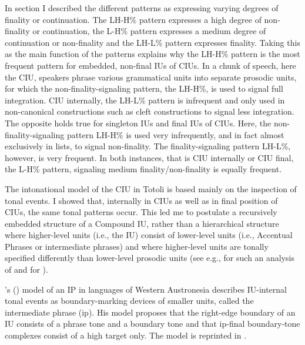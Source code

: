 In section  I described the different patterns as  expressing varying degrees of finality or continuation. The LH-H\% pattern expresses a high degree of non-finality or continuation, the L-H\% pattern expresses a medium degree of continuation or non-finality and the LH-L\% pattern expresses finality. Taking this as the main function of the patterns explains why the LH-H\% pattern is the most frequent pattern for embedded, non-final IUs of CIUs. In a chunk of speech, here the CIU, speakers phrase various grammatical units into separate prosodic units, for which the non-finality-signaling pattern, the LH-H\%, is used to signal full integration. CIU internally, the LH-L\% pattern is infrequent and only used in non-canonical constructions such as cleft constructions to signal less integration. The opposite holds true for singleton IUs and final IUs of CIUs. Here, the non-finality-signaling pattern LH-H\% is used very infrequently, and in fact almost exclusively in lists, to signal non-finality. The finality-signaling pattern LH-L\%, however, is very frequent. In both instances, that is CIU internally or CIU final, the L-H\% pattern, signaling medium finality/non-finality is equally frequent.




The intonational model of the CIU in Totoli is based mainly on the inspection of tonal events. I showed that, internally in CIUs as well as in final position of CIUs, the same tonal patterns occur. This led me to postulate a recursively embedded structure of a Compound IU, rather than a hierarchical structure where higher-level units (i.e., the IU) consist of lower-level units (i.e., Accentual Phrases  or intermediate phrases) and where higher-level units are tonally specified differently than lower-level prosodic units (see e.g., \cite{Jun_2000} for such an analysis of  and \cite{Turkish_Intonation} for ).

 

\citeauthor{Himmelmann_Preliminary_2018}'s (\citeyear{Himmelmann_Preliminary_2018}) model of an IP  in languages of Western Austronesia describes IU-internal tonal events as boundary-marking devices of smaller units, called the intermediate phrase (ip).  His model proposes that the right-edge boundary of an IU consists of a phrase tone and a boundary tone and that ip-final boundary-tone complexes consist of a high target only. The model is reprinted in  	.



